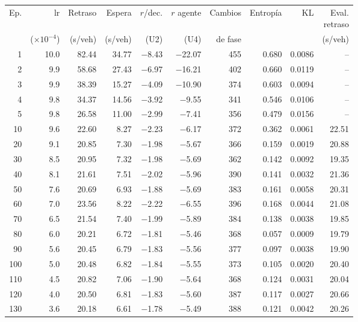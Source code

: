 \begin{table}[H]
\centering
\scriptsize
\setlength{\tabcolsep}{3pt}
\setlength{\tabcolsep}{2pt}
\begin{tabular}{rrrrrrrrrr}
\toprule
Ep. & lr & Retraso & Espera & $r$/dec. & $r$ agente & Cambios & Entropía & KL & \makecell{Eval.\\retraso} \\
 & ($\times 10^{-4}$) & (s/veh) & (s/veh) & (U2) & (U4) & de fase &  &  & (s/veh) \\
\midrule
1 & 10.0 & 82.44 & 34.77 & $-$8.43 & $-$22.07 & 455 & 0.680 & 0.0086 & -- \\
2 & 9.9 & 58.68 & 27.43 & $-$6.97 & $-$16.21 & 402 & 0.660 & 0.0119 & -- \\
3 & 9.9 & 38.39 & 15.27 & $-$4.09 & $-$10.90 & 374 & 0.603 & 0.0094 & -- \\
4 & 9.8 & 34.37 & 14.56 & $-$3.92 & $-$9.55 & 341 & 0.546 & 0.0106 & -- \\
5 & 9.8 & 26.58 & 11.00 & $-$2.99 & $-$7.41 & 356 & 0.479 & 0.0156 & -- \\
10 & 9.6 & 22.60 & 8.27 & $-$2.23 & $-$6.17 & 372 & 0.362 & 0.0061 & 22.51 \\
20 & 9.1 & 20.85 & 7.30 & $-$1.98 & $-$5.67 & 366 & 0.159 & 0.0019 & 20.88 \\
30 & 8.5 & 20.95 & 7.32 & $-$1.98 & $-$5.69 & 362 & 0.142 & 0.0092 & 19.35 \\
40 & 8.1 & 21.61 & 7.51 & $-$2.02 & $-$5.96 & 390 & 0.141 & 0.0032 & 21.36 \\
50 & 7.6 & 20.69 & 6.93 & $-$1.88 & $-$5.69 & 383 & 0.161 & 0.0058 & 20.31 \\
60 & 7.0 & 23.56 & 8.22 & $-$2.22 & $-$6.55 & 396 & 0.168 & 0.0044 & 21.08 \\
70 & 6.5 & 21.54 & 7.40 & $-$1.99 & $-$5.89 & 384 & 0.138 & 0.0038 & 19.85 \\
80 & 6.0 & 20.21 & 6.72 & $-$1.81 & $-$5.46 & 368 & 0.057 & 0.0009 & 19.79 \\
90 & 5.6 & 20.45 & 6.79 & $-$1.83 & $-$5.56 & 377 & 0.097 & 0.0038 & 19.90 \\
100 & 5.0 & 20.48 & 6.82 & $-$1.84 & $-$5.55 & 373 & 0.105 & 0.0020 & 20.40 \\
110 & 4.5 & 20.82 & 7.06 & $-$1.90 & $-$5.64 & 368 & 0.124 & 0.0031 & 20.04 \\
120 & 4.0 & 20.50 & 6.81 & $-$1.83 & $-$5.60 & 387 & 0.117 & 0.0027 & 20.66 \\
130 & 3.6 & 20.18 & 6.61 & $-$1.78 & $-$5.49 & 388 & 0.121 & 0.0042 & 20.26 \\

\end{tabular}
\end{table}
